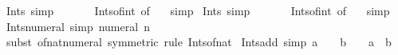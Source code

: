 \begin{isabellebody}
\ Ints{\isacharunderscore}{\kern0pt}{}\ {\isacharbrackleft}{\kern0pt}simp{\isacharbrackright}{\kern0pt}{\isacharcolon}{\kern0pt}\ {\isachardoublequoteopen}{}\ {\isasymin}\ {\isasymint}{\isachardoublequoteclose}\isanewline
%
\isadelimproof
\ \ %
\endisadelimproof
%
\isatagproof
{}\isamarkupfalse%
\ Ints{\isacharunderscore}{\kern0pt}of{\isacharunderscore}{\kern0pt}int\ {\isacharbrackleft}{\kern0pt}of\ {\isachardoublequoteopen}{}{\isachardoublequoteclose}{\isacharbrackright}{\kern0pt}\ \isamarkupfalse%
\ simp%
\endisatagproof
{\isafoldproof}%
%
\isadelimproof
\isanewline
%
\endisadelimproof
\isanewline
{}\isamarkupfalse%
\ Ints{\isacharunderscore}{\kern0pt}{}\ {\isacharbrackleft}{\kern0pt}simp{\isacharbrackright}{\kern0pt}{\isacharcolon}{\kern0pt}\ {\isachardoublequoteopen}{}\ {\isasymin}\ {\isasymint}{\isachardoublequoteclose}\isanewline
%
\isadelimproof
\ \ %
\endisadelimproof
%
\isatagproof
{}\isamarkupfalse%
\ Ints{\isacharunderscore}{\kern0pt}of{\isacharunderscore}{\kern0pt}int\ {\isacharbrackleft}{\kern0pt}of\ {\isachardoublequoteopen}{}{\isachardoublequoteclose}{\isacharbrackright}{\kern0pt}\ \isamarkupfalse%
\ simp%
\endisatagproof
{\isafoldproof}%
%
\isadelimproof
\isanewline
%
\endisadelimproof
\isanewline
{}\isamarkupfalse%
\ Ints{\isacharunderscore}{\kern0pt}numeral\ {\isacharbrackleft}{\kern0pt}simp{\isacharbrackright}{\kern0pt}{\isacharcolon}{\kern0pt}\ {\isachardoublequoteopen}numeral\ n\ {\isasymin}\ {\isasymint}{\isachardoublequoteclose}\isanewline
%
\isadelimproof
\ \ %
\endisadelimproof
%
\isatagproof
{}\isamarkupfalse%
\ {\isacharparenleft}{\kern0pt}subst\ of{\isacharunderscore}{\kern0pt}nat{\isacharunderscore}{\kern0pt}numeral\ {\isacharbrackleft}{\kern0pt}symmetric{\isacharbrackright}{\kern0pt}{\isacharcomma}{\kern0pt}\ rule\ Ints{\isacharunderscore}{\kern0pt}of{\isacharunderscore}{\kern0pt}nat{\isacharparenright}{\kern0pt}%
\endisatagproof
{\isafoldproof}%
%
\isadelimproof
\isanewline
%
\endisadelimproof
\isanewline
{}\isamarkupfalse%
\ Ints{\isacharunderscore}{\kern0pt}add\ {\isacharbrackleft}{\kern0pt}simp{\isacharbrackright}{\kern0pt}{\isacharcolon}{\kern0pt}\ {\isachardoublequoteopen}a\ {\isasymin}\ {\isasymint}\ {\isasymLongrightarrow}\ b\ {\isasymin}\ {\isasymint}\ {\isasymLongrightarrow}\ a\ {\isacharplus}{\kern0pt}\ b\ {\isasymin}\ {\isasymint}{\isachardoublequoteclose}\isanewline
%
\isadelimproof
\ \ %
\endisadelimproof
%
\isatagproof

\end{isabellebody}
